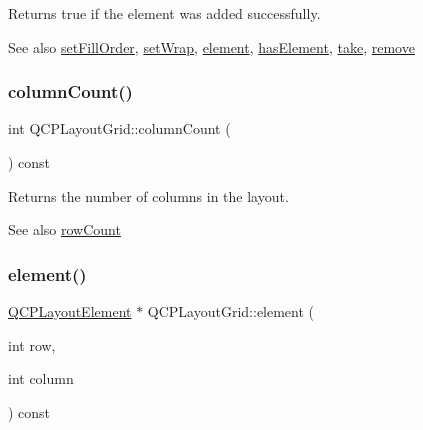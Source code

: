 Returns true if the element was added successfully.

\begin{DoxySeeAlso}{See also}
\hyperlink{class_q_c_p_layout_grid_affc2f3cfd22f28698c5b29b960d2a391}{set\+Fill\+Order}, \hyperlink{class_q_c_p_layout_grid_ab36af18d77e4428386d02970382ee598}{set\+Wrap}, \hyperlink{class_q_c_p_layout_grid_a602b426609b4411cf6a93c3ddf3a381a}{element}, \hyperlink{class_q_c_p_layout_grid_ab0cf4f7edc9414a3bfaddac0f46dc0a0}{has\+Element}, \hyperlink{class_q_c_p_layout_grid_aee961c2eb6cf8a85dcbc5a7d7b6c1a00}{take}, \hyperlink{class_q_c_p_layout_a6c58f537d8086f352576ab7c5b15d0bc}{remove} 
\end{DoxySeeAlso}
\mbox{\label{class_q_c_p_layout_grid_a1a2962cbf45011405b64b913afa8e7a2}} 
\subsubsection{\texorpdfstring{column\+Count()}{columnCount()}}
{\footnotesize\ttfamily int Q\+C\+P\+Layout\+Grid\+::column\+Count (\begin{DoxyParamCaption}{ }\end{DoxyParamCaption}) const\hspace{0.3cm}{\ttfamily [inline]}}

Returns the number of columns in the layout.

\begin{DoxySeeAlso}{See also}
\hyperlink{class_q_c_p_layout_grid_a19c66fd76cbce58a8e94f33797e0c0aa}{row\+Count} 
\end{DoxySeeAlso}
\mbox{\label{class_q_c_p_layout_grid_a602b426609b4411cf6a93c3ddf3a381a}} 
\subsubsection{\texorpdfstring{element()}{element()}}
{\footnotesize\ttfamily \hyperlink{class_q_c_p_layout_element}{Q\+C\+P\+Layout\+Element} $\ast$ Q\+C\+P\+Layout\+Grid\+::element (\begin{DoxyParamCaption}\item[{int}]{row,  }\item[{int}]{column }\end{DoxyParamCaption}) const}

